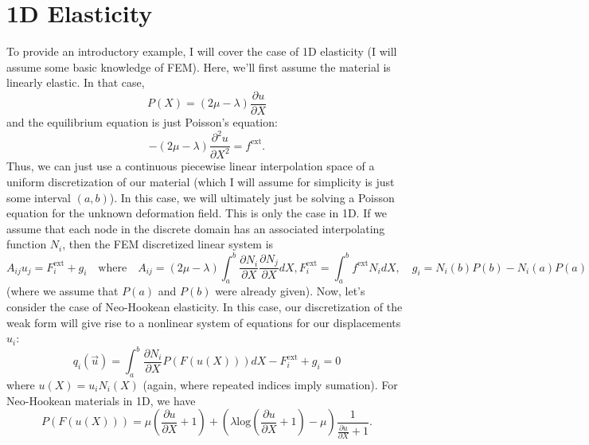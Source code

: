 \section*{1D Elasticity}

To provide an introductory example, I will cover the case of 1D elasticity (I will assume some basic knowledge of FEM). Here, we'll first assume the material is linearly elastic. In that case,
\begin{equation*}
P(X) = \left( 2 \mu - \lambda \right) \frac{\partial u}{\partial X}
\end{equation*}
and the equilibrium equation is just Poisson's equation:
\begin{equation*}
-\left( 2 \mu - \lambda \right) \frac{\partial^2 u}{\partial X^2} = f^{\text{ext}}.
\end{equation*}
Thus, we can just use a continuous piecewise linear interpolation space of a uniform discretization of our material (which I will assume for simplicity is just some interval $(a,b)$). In this case, we will ultimately just be solving a Poisson equation for the unknown deformation field. This is only the case in 1D. If we assume that each node in the discrete domain has an associated interpolating function $N_i$, then the FEM discretized linear system is
\begin{subequations}
\begin{equation*}
A_{ij} u_j = F^{\text{ext}}_i + g_i \quad \text{where} \quad A_{ij} = \left( 2 \mu - \lambda \right) \int_a^b \frac{\partial N_i}{\partial X}\frac{\partial N_j}{\partial X} dX,
\end{equation*}
\begin{equation*}
F^{\text{ext}}_i = \int_a^b f^{\text{ext}} N_i dX, \quad g_i = N_i(b) P(b) - N_i(a) P(a)
\end{equation*}
\end{subequations}
(where we assume that $P(a)$ and $P(b)$ were already given). Now, let's consider the case of Neo-Hookean elasticity. In this case, our discretization of the weak form will give rise to a nonlinear system of equations for our displacements $u_i$:
\begin{equation*}
q_i \left( \vec{u} \right) = \int_a^b \frac{\partial N_i}{\partial X} P(F(u(X))) dX - F^{\text{ext}}_i + g_i = 0
\end{equation*}
where $u(X) = u_i N_i(X)$ (again, where repeated indices imply sumation). For Neo-Hookean materials in 1D, we have
\begin{equation*}
P(F(u(X))) = \mu \left( \frac{\partial u}{\partial X} + 1 \right) + \left( \lambda \text{log} \left( \frac{\partial u}{\partial X} + 1 \right) - \mu \right) \frac{1}{\frac{\partial u}{\partial X} + 1}.
\end{equation*}
